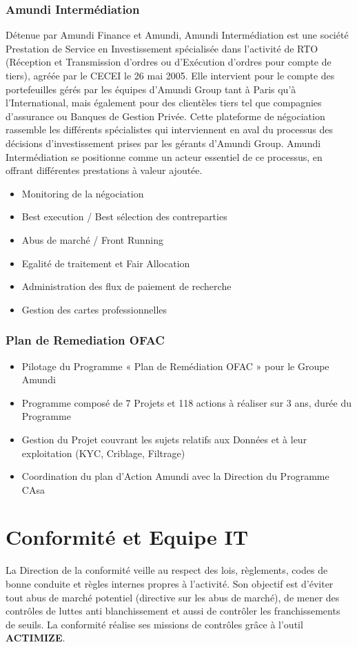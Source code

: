 \documentclass[12pt,a4paper]{report}
\begin{document}
\subsubsection{Amundi Intermédiation}
Détenue par Amundi Finance et Amundi, Amundi Intermédiation est une société Prestation de Service en Investissement spécialisée dans l’activité de RTO (Réception et Transmission d’ordres ou d’Exécution d’ordres pour compte de tiers), agréée par le CECEI le 26 mai 2005. Elle intervient pour le compte des portefeuilles gérés par les équipes d’Amundi Group tant à Paris qu’à l’International, mais également pour des clientèles tiers tel que compagnies d’assurance ou Banques de Gestion Privée. 
Cette plateforme de négociation rassemble les différents spécialistes qui interviennent en aval du processus des décisions d’investissement prises par les gérants d’Amundi Group. 
Amundi Intermédiation se positionne comme un acteur essentiel de ce processus, en offrant différentes prestations à valeur ajoutée.
\begin{itemize}
\item Monitoring de la négociation
\item Best execution / Best sélection des contreparties
\item Abus de marché / Front Running
\item Egalité de traitement et Fair Allocation
\item Administration des flux de paiement de recherche
\item Gestion des cartes professionnelles
\end{itemize}

\subsubsection{Plan de Remediation OFAC}
\begin{itemize}
\item Pilotage du Programme « Plan de Remédiation OFAC » pour le Groupe Amundi
\item Programme composé de 7 Projets et 118 actions à réaliser sur 3 ans, durée du Programme
\item Gestion du Projet couvrant les sujets relatifs aux Données et à leur exploitation (KYC, Criblage, Filtrage)
\item Coordination du plan d’Action Amundi avec la Direction du Programme CAsa
\end{itemize}

\newpage
\section{\textbf{Conformité et Equipe IT}}
La Direction de la conformité veille au respect des lois, règlements, codes de bonne conduite et règles internes propres à l'activité. Son objectif est d'éviter tout abus de marché potentiel (directive sur les abus de marché), de mener des contrôles de luttes anti blanchissement et aussi de contrôler les franchissements de seuils.
La conformité réalise ses missions de contrôles grâce à l'outil \textbf{ACTIMIZE}.
\end{document}
